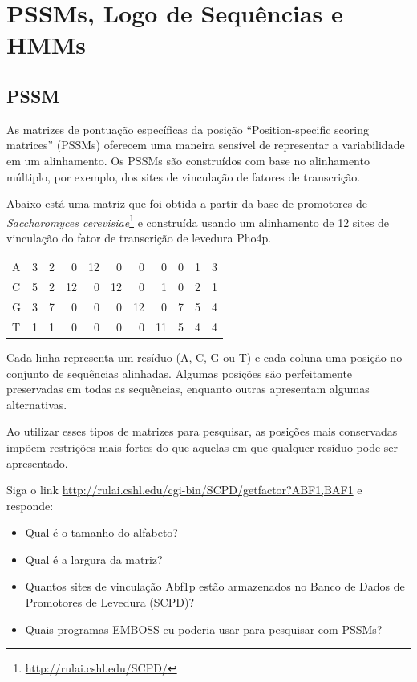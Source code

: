 \documentclass[letter,11pt]{book}
\begin{document}
\chapter{PSSMs, Logo de Sequências e HMMs}

\section{PSSM}

As matrizes de pontuação específicas da posição ``Position-specific scoring matrices'' (PSSMs) oferecem uma maneira sensível de representar a variabilidade em um alinhamento. Os PSSMs são construídos com base no alinhamento múltiplo, por exemplo, dos sites de vinculação de fatores de transcrição.

Abaixo está uma matriz que foi obtida a partir da base de promotores de \textit{Saccharomyces cerevisiae}\footnote{\url{http://rulai.cshl.edu/SCPD/}} e construída usando um alinhamento de 12 sites de vinculação do fator de transcrição de levedura Pho4p.

\vskip5pt
\begin{center}
\begin{tabular}{l|r r r r r r r r r r }
A &  3 &  2 &  0 & 12 &  0 &  0 &  0 &  0 &  1 &  3\\
C &  5 &  2 & 12 &  0 & 12 &  0 &  1 &  0 &  2 &  1\\
G &  3 &  7 &  0 &  0 &  0 & 12 &  0 &  7 &  5 &  4\\
T &  1 &  1 &  0 &  0 &  0 &  0 & 11 &  5 &  4 &  4\\
\end{tabular}
\end{center}

Cada linha representa um resíduo (A, C, G ou T) e cada coluna uma posição no conjunto de sequências alinhadas. Algumas posições são perfeitamente preservadas em todas as sequências, enquanto outras apresentam algumas alternativas.


Ao utilizar esses tipos de matrizes para pesquisar, as posições mais conservadas impõem restrições mais fortes do que aquelas em que qualquer resíduo pode ser apresentado.

{\color{red}
Siga o link \url{http://rulai.cshl.edu/cgi-bin/SCPD/getfactor?ABF1,BAF1} e responde:
\begin{itemize}
\item Qual é o tamanho do alfabeto?
\item Qual é a largura da matriz?
\item Quantos sites de vinculação Abf1p estão armazenados no Banco de Dados de Promotores de Levedura (SCPD)?
\item Quais programas EMBOSS eu poderia usar para pesquisar com PSSMs?
\end{itemize}
}
\end{document}
